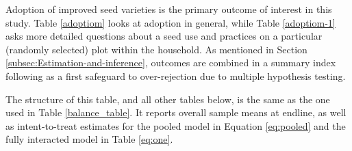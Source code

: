 \documentclass[english]{article}\usepackage[]{graphicx}\usepackage[]{xcolor}
\begin{document}
Adoption of improved seed varieties is the primary outcome of interest
in this study. Table \ref{adoptiom} looks at adoption in general,
while Table \ref{adoptiom-1} asks more detailed questions about a
seed use and practices on a particular (randomly selected) plot within
the household. As mentioned in Section \ref{subsec:Estimation-and-inference},
outcomes are combined in a summary index following \citet{doi:10.1198/016214508000000841}
as a first safeguard to over-rejection due to multiple hypothesis
testing.

The structure of this table, and all other tables below, is the same
as the one used in Table \ref{balance_table}. It reports overall
sample means at endline, as well as intent-to-treat estimates for
the pooled model in Equation \ref{eq:pooled} and the fully interacted
model in Table \ref{eq:one}.
\end{document}
